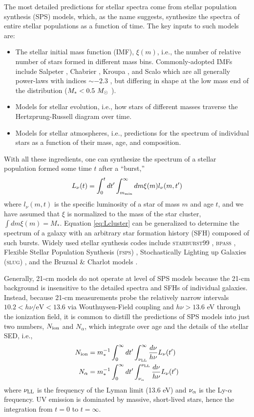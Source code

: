 The most detailed predictions for stellar spectra come from stellar population synthesis (SPS) models, which, as the name suggests, synthesize the spectra of entire stellar populations as a function of time. The key inputs to such models are:
\begin{itemize}
	\item The stellar initial mass function (IMF), $\xi(m)$, i.e., the number of relative number of stars formed in different mass bins. Commonly-adopted IMFs include Salpeter \cite{Salpeter1955}, Chabrier \cite{Chabrier2003}, Kroupa \cite{Kroupa2001}, and Scalo \cite{Scalo1998} which are all generally power-laws with indices $\sim -2.3$ , but differing in shape at the low mass end of the distribution ($M_{\ast} < 0.5 \ M_{\odot}$ ).
	\item Models for stellar evolution, i.e., how stars of different masses traverse the Hertzprung-Russell diagram over time.
	\item Models for stellar atmospheres, i.e., predictions for the spectrum of individual stars as a function of their mass, age, and composition.
\end{itemize}
With all these ingredients, one can synthesize the spectrum of a stellar population formed some time $t$ after a ``burst,''
\begin{equation}
	L_{\nu}(t) = \int_0^t dt^{\prime} \int_{m_{\text{min}}}^{\infty} dm \xi(m) l_{\nu} (m, t^{\prime}) \label{eq:Lcluster}
\end{equation}
where $l_{\nu}(m, t)$ is the specific luminosity of a star of mass $m$ and age $t$, and we have assumed that $\xi$ is normalized to the mass of the star cluster, $\int dm \xi(m) = M_{\ast}$. Equation \ref{eq:Lcluster} can be generalized to determine the spectrum of a galaxy with an arbitrary star formation history (SFH) composed of such bursts. Widely used stellar synthesis codes include \textsc{starburst99} \cite{Leitherer1999}, \textsc{bpass} \cite{Eldridge2009}, Flexible Stellar Population Synthesis (\textsc{fsps}) \cite{Conroy2009}, Stochastically Lighting up Galaxies (\textsc{slug}) \cite{daSilva2012}, and the Bruzual \& Charlot models \cite{Bruzual2003}.

Generally, 21-cm models do not operate at level of SPS models because the 21-cm background is insensitive to the detailed spectra and SFHs of individual galaxies. Instead, because 21-cm measurements probe the relatively narrow intervals $10.2 < h\nu / \mathrm{eV} < 13.6$ via Wouthuysen-Field coupling and $h\nu > 13.6$ eV through the ionization field, it is common to distill the predictions of SPS models into just two numbers, $N_{\text{ion}}$ and $N_{\alpha}$, which integrate over age and the details of the stellar SED, i.e.,
\begin{align}
	N_{\text{ion}} & = m_{\ast}^{-1} \int_0^{\infty} dt^{\prime} \int_{\nu_{\text{LL}}}^{\infty} \frac{d\nu}{h\nu} L_{\nu}(t^{\prime}) \\
	N_{\alpha} & = m_{\ast}^{-1} \int_0^{\infty} dt^{\prime} \int_{\nu_{\alpha}}^{\nu_{\text{LL}}} \frac{d\nu}{h\nu} L_{\nu}(t^{\prime})
\end{align}
where $\nu_{\text{LL}}$ is the frequency of the Lyman limit (13.6 eV) and $\nu_{\alpha}$ is the Ly-$\alpha$ frequency. UV emission is dominated by massive, short-lived stars, hence the integration from $t=0$ to $t=\infty$. 

